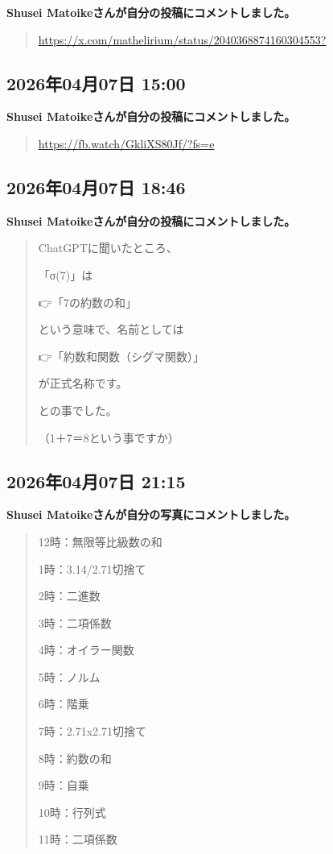 \textbf{Shusei Matoikeさんが自分の投稿にコメントしました。}

\begin{quote}
\url{https://x.com/mathelirium/status/2040368874160304553?}
\end{quote}

\subsection*{2026年04月07日 15:00}

\textbf{Shusei Matoikeさんが自分の投稿にコメントしました。}

\begin{quote}
\url{https://fb.watch/GkliXS80Jf/?fs=e}
\end{quote}

\subsection*{2026年04月07日 18:46}

\textbf{Shusei Matoikeさんが自分の投稿にコメントしました。}

\begin{quote}
ChatGPTに聞いたところ、

「σ(7)」は

👉「7の約数の和」

という意味で、名前としては

👉「約数和関数（シグマ関数）」

が正式名称です。

との事でした。

（1＋7＝8という事ですか）
\end{quote}

\subsection*{2026年04月07日 21:15}

\textbf{Shusei Matoikeさんが自分の写真にコメントしました。}

\begin{quote}
12時：無限等比級数の和

1時：3.14/2.71切捨て

2時：二進数

3時：二項係数

4時：オイラー関数

5時：ノルム

6時：階乗

7時：2.71x2.71切捨て

8時：約数の和

9時：自乗

10時：行列式

11時：二項係数
\end{quote}

